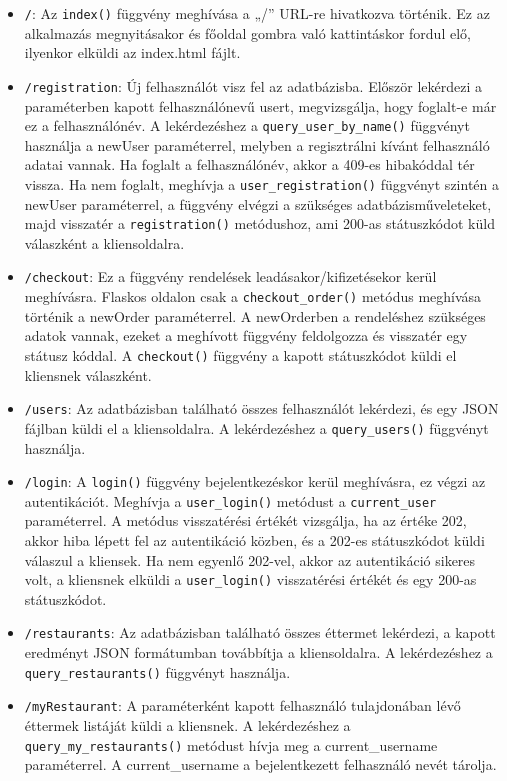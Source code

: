 \begin{itemize}
\item \texttt{/}:
Az \texttt{index()} függvény meghívása a „/” URL-re hivatkozva történik. Ez az alkalmazás megnyitásakor és főoldal gombra való kattintáskor fordul elő, ilyenkor elküldi az index.html fájlt.
\item \texttt{/registration}:
Új felhasználót visz fel az adatbázisba. Először lekérdezi a paraméterben kapott felhasználónevű usert, megvizsgálja, hogy foglalt-e már ez a felhasználónév. A lekérdezéshez a \texttt{query\_user\_by\_name()} függvényt használja a newUser paraméterrel, melyben a regisztrálni kívánt felhasználó adatai vannak. Ha foglalt a felhasználónév, akkor a 409-es hibakóddal tér vissza. Ha nem foglalt, meghívja a \texttt{user\_registration()} függvényt szintén a newUser paraméterrel, a függvény elvégzi a szükséges adatbázisműveleteket, majd visszatér a \texttt{registration()} metódushoz, ami 200-as státuszkódot küld válaszként a kliensoldalra.
\item \texttt{/checkout}:
Ez a függvény rendelések leadásakor/kifizetésekor kerül meghívásra. Flaskos oldalon csak a \texttt{checkout\_order()} metódus meghívása történik a newOrder paraméterrel. A newOrderben a rendeléshez szükséges adatok vannak, ezeket a meghívott függvény feldolgozza és visszatér egy státusz kóddal. A \texttt{checkout()} függvény a kapott státuszkódot küldi el kliensnek válaszként.
\item \texttt{/users}:
Az adatbázisban található összes felhasználót lekérdezi, és egy JSON fájlban küldi el a kliensoldalra. A lekérdezéshez a \texttt{query\_users()} függvényt használja.
\item \texttt{/login}:
A \texttt{login()} függvény bejelentkezéskor kerül meghívásra, ez végzi az autentikációt. Meghívja a \texttt{user\_login()} metódust a \texttt{current\_user} paraméterrel. A metódus visszatérési értékét vizsgálja, ha az értéke 202, akkor hiba lépett fel az autentikáció közben, és a 202-es státuszkódot küldi válaszul a kliensek. Ha nem egyenlő 202-vel, akkor az autentikáció sikeres volt, a kliensnek elküldi a \texttt{user\_login()} visszatérési értékét és egy 200-as státuszkódot.
\item \texttt{/restaurants}:
Az adatbázisban található összes éttermet lekérdezi, a kapott eredményt JSON formátumban továbbítja a kliensoldalra. A lekérdezéshez a \texttt{query\_restaurants()} függvényt használja.
\item \texttt{/myRestaurant}:
A paraméterként kapott felhasználó tulajdonában lévő éttermek listáját küldi a kliensnek. A lekérdezéshez a \texttt{query\_my\_restaurants()} metódust hívja meg a current\_username paraméterrel. A current\_username a bejelentkezett felhasználó nevét tárolja.

\end{itemize}
